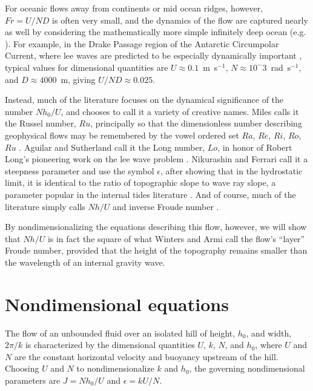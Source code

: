 \documentclass[12pt]{article}
\begin{document}
	For oceanic flows away from continents or mid ocean ridges, however, $Fr=U/ND$ is often very small, and the dynamics of the flow are captured nearly as well by considering the mathematically more simple infinitely deep ocean (e.g. \cite{Long1953a}). For example, in the Drake Passage region of the Antarctic Circumpolar Current, where lee waves are predicted to be especially dynamically important \citep{Nikurashin2010a}, typical values for dimensional quantities are $U \approx 0.1$~m~s$^{-1}$, $N \approx 10^-3$~rad~s$^{-1}$, and $D \approx 4000$~m, giving $U/ND \approx 0.025$. 
	
	Instead, much of the literature focuses on the dynamical significance of the number $Nh_0/U$, and chooses to call it a variety of creative names. Miles calls it the Russel number, $Ru$, principally so that the dimensionless number describing geophysical flows may be remembered by the vowel ordered set $Ra$, $Re$, $Ri$, $Ro$, $Ru$ \citep{Miles1969}. Aguilar and Sutherland call it the Long number, $Lo$, in honor of Robert Long's pioneering work on the lee wave problem \citep{Aguilar2006a,Long1953a}. Nikurashin and Ferrari call it a steepness parameter and use the symbol $\epsilon$, after showing that in the hydrostatic limit, it is identical to the ratio of topographic slope to wave ray slope, a parameter popular in the internal tides literature \citep{Nikurashin2010a}. And of course, much of the literature simply calls $Nh/U$ and inverse Froude number \citep{Legg2008a,Klymak2010,Eckermann2010,Winters2012}.
	
	By nondimensionalizing the equations describing this flow, however, we will show that $Nh/U$ is in fact the square of what Winters and Armi call the flow's ``layer'' Froude number, provided that the height of the topography remains smaller than the wavelength of an internal gravity wave. 
	
	
	\section{Nondimensional equations} \label{eq:equations}
	
	The flow of an unbounded fluid over an isolated hill of height, $h_0$, and width, $2\pi/k$ is characterized by the dimensional quantities
	$U$, $k$, $N$, and $h_0$, where $U$ and $N$ are the constant horizontal velocity and buoyancy upstream of the hill.  Choosing $U$ and $N$ to nondimensionalize $k$ and $h_0$, the governing
	nondimensional parameters are $J = N h_0/U$ and $\epsilon = k U/N$. 
	
\end{document}
